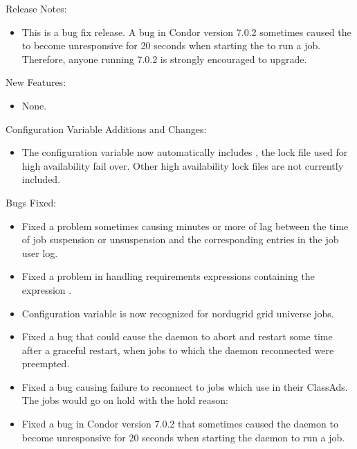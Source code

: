\noindent Release Notes:

\begin{itemize}

\item This is a bug fix release.  A bug in Condor version 7.0.2 sometimes caused
the  to become unresponsive for 20 seconds when starting
the  to run a job.
Therefore, anyone running 7.0.2 is strongly encouraged to upgrade.

\end{itemize}


\noindent New Features:

\begin{itemize}

\item None.

\end{itemize}

\noindent Configuration Variable Additions and Changes:

\begin{itemize}

\item The configuration variable  now automatically 
includes ,
the lock file used for high availability  fail over.  Other
high availability lock files are not currently included.

\end{itemize}

\noindent Bugs Fixed:

\begin{itemize}

\item Fixed a problem sometimes causing minutes or more of lag between
the time of job suspension or unsuspension and the corresponding entries
in the job user log.

\item Fixed a problem in   handling
requirements expressions containing  the expression .

\item Configuration variable 
is now recognized for nordugrid grid universe jobs.

\item Fixed a bug that could cause the  daemon to abort
and restart some time after a graceful restart,
when jobs to which the  daemon reconnected were preempted.

\item Fixed a bug causing failure to reconnect to jobs which use
in their ClassAds.  The jobs would go on
hold with the hold reason:

\item Fixed a bug in Condor version 7.0.2 that sometimes caused 
the  daemon to become
unresponsive for 20 seconds when starting the  daemon
to run a job.

\end{itemize}

